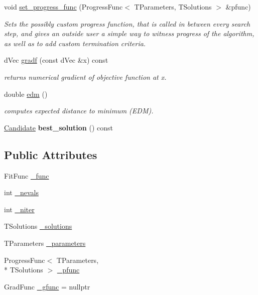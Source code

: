 \begin{DoxyCompactItemize}
\item 
void \hyperlink{classlibcmaes_1_1ESOStrategy_a9d44ba79106b6afbd5881c4f33800840}{set\-\_\-progress\-\_\-func} (Progress\-Func$<$ T\-Parameters, T\-Solutions $>$ \&pfunc)
\begin{DoxyCompactList}\small\item\em Sets the possibly custom progress function, that is called in between every search step, and gives an outside user a simple way to witness progress of the algorithm, as well as to add custom termination criteria. \end{DoxyCompactList}\item 
d\-Vec \hyperlink{classlibcmaes_1_1ESOStrategy_a32a4e450cd34f8161b3768e7c2c2c99a}{gradf} (const d\-Vec \&x) const 
\begin{DoxyCompactList}\small\item\em returns numerical gradient of objective function at x. \end{DoxyCompactList}\item 
double \hyperlink{classlibcmaes_1_1ESOStrategy_a6350c635353e7b54e78abb223a5d4029}{edm} ()
\begin{DoxyCompactList}\small\item\em computes expected distance to minimum (E\-D\-M). \end{DoxyCompactList}\item 
\hypertarget{classlibcmaes_1_1ESOStrategy_a81441905608aba3daa6d60a78eb47763}{\hyperlink{classlibcmaes_1_1Candidate}{Candidate} {\bfseries best\-\_\-solution} () const }\label{classlibcmaes_1_1ESOStrategy_a81441905608aba3daa6d60a78eb47763}

\end{DoxyCompactItemize}
\subsection*{Public Attributes}
\begin{DoxyCompactItemize}
\item 
Fit\-Func \hyperlink{classlibcmaes_1_1ESOStrategy_a1a29d4c30bbdb6021920275e81fa4dc4}{\-\_\-func}
\item 
int \hyperlink{classlibcmaes_1_1ESOStrategy_a19667f1e69856e7cfd6219b63cbaa59d}{\-\_\-nevals}
\item 
int \hyperlink{classlibcmaes_1_1ESOStrategy_aaf5c063558da34826ea1f976423ccfbb}{\-\_\-niter}
\item 
T\-Solutions \hyperlink{classlibcmaes_1_1ESOStrategy_a8fe0f8dc2201951e9e4ed2768b5a09ab}{\-\_\-solutions}
\item 
T\-Parameters \hyperlink{classlibcmaes_1_1ESOStrategy_a295e49238ceef8f11b3fb35296a8364a}{\-\_\-parameters}
\item 
Progress\-Func$<$ T\-Parameters, \\*
T\-Solutions $>$ \hyperlink{classlibcmaes_1_1ESOStrategy_a25d597189596f434a2530887fddea189}{\-\_\-pfunc}
\item 
Grad\-Func \hyperlink{classlibcmaes_1_1ESOStrategy_a76926e49a2ca941a22362167bc230093}{\-\_\-gfunc} = nullptr
\end{DoxyCompactItemize}


